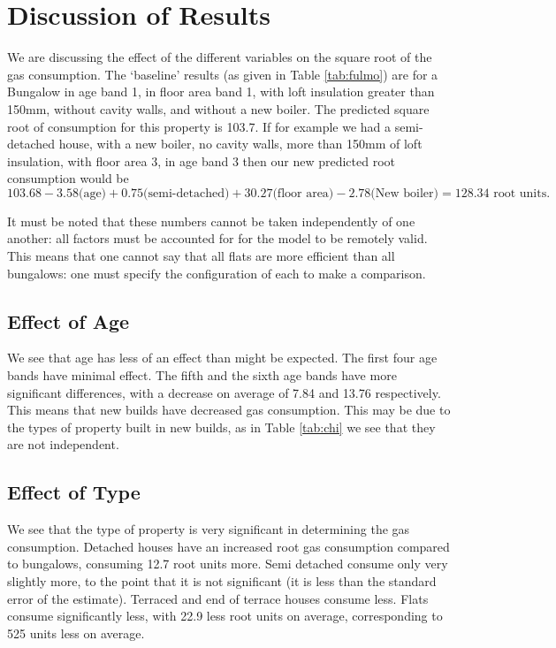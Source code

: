 \documentclass[8pt]{extarticle}
\begin{document}
\section{Discussion of Results}

We are discussing the effect of the different variables on the square root of the gas consumption. The `baseline' results (as given in Table \ref{tab:fulmo}) are for a Bungalow in age band 1, in floor area band 1, with loft insulation greater than 150mm, without cavity walls, and without a new boiler. The predicted square root of consumption for this property is 103.7. If for example we had a semi-detached house, with a new boiler, no cavity walls, more than 150mm of loft insulation, with floor area 3, in age band 3 then our new predicted root consumption would be $$103.68 - 3.58 \text{(age)} + 0.75 \text{(semi-detached)} + 30.27 \text{(floor area)} - 2.78 \text{(New boiler)} = 128.34 \text{ root units}.$$

It must be noted that these numbers cannot be taken independently of one another: all factors must be accounted for for the model to be remotely valid. This means that one cannot say that all flats are more efficient than all bungalows: one must specify the configuration of each to make a comparison.

\subsection{Effect of Age}
We see that age has less of an effect than might be expected. The first four age bands have minimal effect. The fifth and the sixth age bands have more significant differences, with a decrease on average of 7.84 and 13.76 respectively. This means that new builds have decreased gas consumption. This may be due to the types of property built in new builds, as in Table \ref{tab:chi} we see that they are not independent.

\subsection{Effect of Type}
We see that the type of property is very significant in determining the gas consumption. Detached houses have an increased root gas consumption compared to bungalows, consuming 12.7 root units more. Semi detached consume only very slightly more, to the point that it is not significant (it is less than the standard error of the estimate). Terraced and end of terrace houses consume less. Flats consume significantly less, with 22.9 less root units on average, corresponding to 525 units less on average. 
\end{document}

